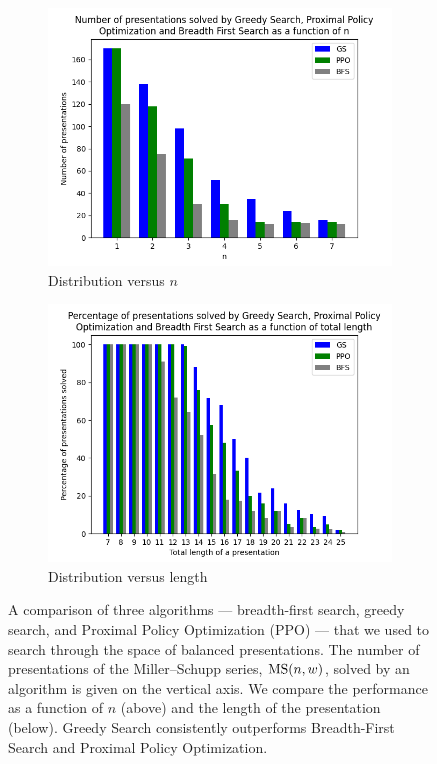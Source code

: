 \begin{figure}
	\centering
	\begin{subfigure}[b]{0.5\textwidth}
		\includegraphics[width=1.1\textwidth]{fig/performance_vs_n.png}
		\caption{Distribution versus $n$}
		\label{fig:performance_vs_n}
	\end{subfigure}
	\begin{subfigure}[b]{0.5\textwidth}
		\centering
		\includegraphics[width=1.1\textwidth]{fig/performance_vs_length.png}
		\caption{Distribution versus length}
		\label{fig:performance_vs_length}
	\end{subfigure}
	\caption{A comparison of three algorithms --- breadth-first search, greedy search, and Proximal Policy Optimization (PPO) --- that we used to search through the space of balanced presentations. The number of presentations of the Miller--Schupp series, $\text{MS}(n, w)$, solved by an algorithm is given on the vertical axis. We compare the performance as a function of $n$ (above) and the length of the presentation (below). Greedy Search consistently outperforms Breadth-First Search and Proximal Policy Optimization.}
	\label{fig:performance}
\end{figure}

